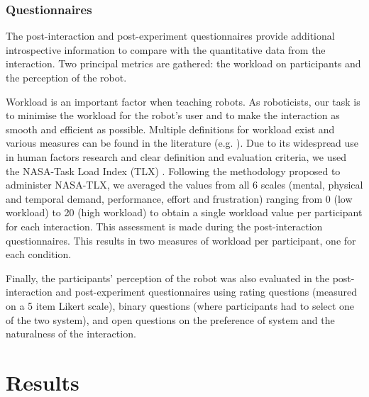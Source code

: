 \subsubsection{Questionnaires} \label{ssec:control_questionnaires}

The post-interaction and post-experiment questionnaires provide additional introspective information to compare with the quantitative data from the interaction. Two principal metrics are gathered: the workload on participants and the perception of the robot. 

Workload is an important factor when teaching robots. As roboticists, our task is to minimise the workload for the robot's user and to make the interaction as smooth and efficient as possible. Multiple definitions for workload exist and various measures can be found in the literature (e.g. \citealt{wierwille1983evaluation,moray2013mental}). Due to its widespread use in human factors research \citep{hart2006nasa} and clear definition and evaluation criteria, we used the NASA-Task Load Index (TLX) \citep{hart1988development}. Following the methodology proposed to administer NASA-TLX, we averaged the values from all 6 scales (mental, physical and temporal demand, performance, effort and frustration) ranging from 0 (low workload) to 20 (high workload) to obtain a single workload value per participant for each interaction. This assessment is made during the post-interaction questionnaires. This results in two measures of workload per participant, one for each condition.

Finally, the participants' perception of the robot was also evaluated in the post-interaction and post-experiment questionnaires using rating questions (measured on a 5 item Likert scale), binary questions (where participants had to select one of the two system), and open questions on the preference of system and the naturalness of the interaction. 

\section{Results}


